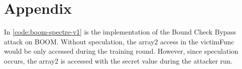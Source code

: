 \section{Appendix}

In \ref{code:boom-spectre-v1} is the implementation of the Bound Check Bypass attack
on BOOM. Without speculation, the array2 access in the victimFunc would be only accessed
during the training round. However, since speculation occurs, the array2 is accessed with
the secret value during the attacker run.

\onecolumn

